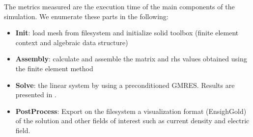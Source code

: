 The metrics measured are the execution time of the main components of the simulation. We enumerate these parts in the following:
\begin{itemize}
\item \textbf{Init}: load mesh from filesystem and initialize solid toolbox (finite element context and algebraic data structure)
\item \textbf{Assembly}: calculate and assemble the matrix and rhs values obtained using the finite element method
\item \textbf{Solve}: the linear system by using a preconditioned GMRES. Results
  are presented in .
\item \textbf{PostProcess}: Export on the filesystem a visualization format (EnsighGold) of the
  solution and other fields of interest such as current density and electric field.
\end{itemize}

